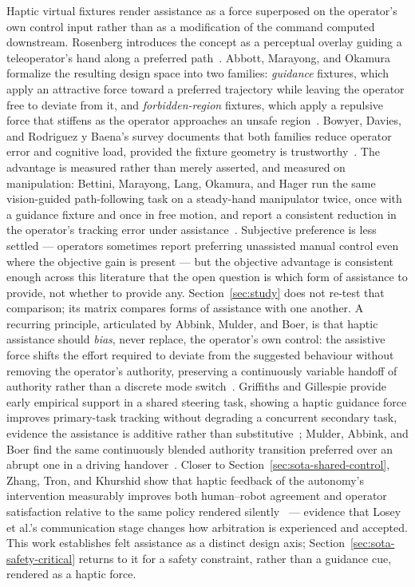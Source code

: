 \documentclass[12pt,a4paper,twoside,openright]{report}
\begin{document}
Haptic virtual fixtures render assistance as a force superposed on the operator's own control input rather than as a modification of the command computed downstream. Rosenberg introduces the concept as a perceptual overlay guiding a teleoperator's hand along a preferred path~\cite{rosenberg1993virtual}. Abbott, Marayong, and Okamura formalize the resulting design space into two families: \emph{guidance} fixtures, which apply an attractive force toward a preferred trajectory while leaving the operator free to deviate from it, and \emph{forbidden-region} fixtures, which apply a repulsive force that stiffens as the operator approaches an unsafe region~\cite{abbott2007haptic}. Bowyer, Davies, and Rodriguez y Baena's survey documents that both families reduce operator error and cognitive load, provided the fixture geometry is trustworthy~\cite{bowyer2014activeconstraints}. The advantage is measured rather than merely asserted, and measured on manipulation: Bettini, Marayong, Lang, Okamura, and Hager run the same vision-guided path-following task on a steady-hand manipulator twice, once with a guidance fixture and once in free motion, and report a consistent reduction in the operator's tracking error under assistance~\cite{bettini2004vision}. Subjective preference is less settled --- operators sometimes report preferring unassisted manual control even where the objective gain is present --- but the objective advantage is consistent enough across this literature that the open question is which form of assistance to provide, not whether to provide any. Section~\ref{sec:study} does not re-test that comparison; its matrix compares forms of assistance with one another. A recurring principle, articulated by Abbink, Mulder, and Boer, is that haptic assistance should \emph{bias}, never replace, the operator's own control: the assistive force shifts the effort required to deviate from the suggested behaviour without removing the operator's authority, preserving a continuously variable handoff of authority rather than a discrete mode switch~\cite{abbink2012hapticshared}. Griffiths and Gillespie provide early empirical support in a shared steering task, showing a haptic guidance force improves primary-task tracking without degrading a concurrent secondary task, evidence the assistance is additive rather than substitutive~\cite{griffiths2005sharing}; Mulder, Abbink, and Boer find the same continuously blended authority transition preferred over an abrupt one in a driving handover~\cite{mulder2012sharingcontrol}. Closer to Section~\ref{sec:sota-shared-control}, Zhang, Tron, and Khurshid show that haptic feedback of the autonomy's intervention measurably improves both human--robot agreement and operator satisfaction relative to the same policy rendered silently~\cite{zhang2021hapticagreement} --- evidence that Losey et al.'s communication stage changes how arbitration is experienced and accepted. This work establishes felt assistance as a distinct design axis; Section~\ref{sec:sota-safety-critical} returns to it for a safety constraint, rather than a guidance cue, rendered as a haptic force.
\end{document}
